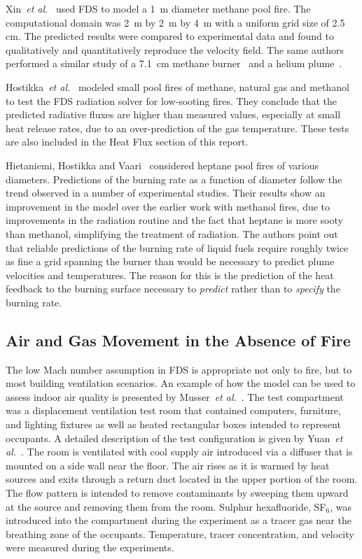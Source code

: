 Xin~{\em et  al.}~\cite{Xin:JSS2005} used FDS to model  a 1~m diameter methane pool  fire.  The  computational domain was  2~m by 2~m  by 4~m with  a uniform  grid  size of  2.5  cm.  The  predicted results  were compared  to   experimental  data  and  found   to  qualitatively  and quantitatively reproduce   the  velocity  field.   The  same  authors performed a similar study of a 7.1~cm methane burner~\cite{Xin:CF2005} and a helium plume~\cite{Xin:CS2002}.

Hostikka~{\em et al.}~\cite{Hostikka:3} modeled small pool fires of methane, natural gas and methanol  to test the FDS radiation solver for low-sooting fires.  They conclude that the predicted radiative fluxes are higher than measured values, especially at small heat release rates, due to an over-prediction of the gas temperature. These tests are also included in the Heat Flux section of this report.

Hietaniemi,  Hostikka and  Vaari~\cite{Hietaniemi:1}  considered heptane pool fires of various diameters.  Predictions of the burning rate as a function  of  diameter  follow  the  trend observed  in  a  number  of experimental studies.  Their results show an improvement  in the model over the earlier work with  methanol fires, due to improvements in the radiation  routine  and the  fact  that  heptane  is more  sooty  than methanol, simplifying  the treatment of radiation.   The authors point out  that reliable  predictions of  the burning  rate of  liquid fuels require roughly twice as fine a grid spanning the burner than would be necessary to predict plume velocities and temperatures. The reason for this is  the prediction of the heat  feedback to the  burning surface necessary to {\em predict} rather  than to {\em specify} the burning rate.


\subsection{Air and Gas Movement in the Absence of Fire}

The low Mach number assumption in FDS is appropriate not only to fire, but to  most building  ventilation scenarios.  An  example of  how the model can  be used  to  assess indoor  air  quality  is presented  by Musser~{\em  et  al.}~\cite{Musser:1}.   The  test compartment  was  a displacement ventilation  test   room   that  contained   computers, furniture, and  lighting fixtures as well as  heated rectangular boxes intended to  represent occupants.  A detailed description  of the test configuration is  given by Yuan~{\em et  al.}~\cite{Yuan:1}.  The room is ventilated with  cool supply air introduced via  a diffuser that is mounted on a side  wall near the floor. The air rises  as it is warmed by heat sources  and exits through a return duct  located in the upper portion  of  the  room.  The   flow  pattern  is  intended  to  remove contaminants by sweeping  them upward at the source  and removing them from the room.  Sulphur  hexafluoride, SF$_6$, was introduced into the compartment during the  experiment as a tracer gas  near the breathing zone  of  the   occupants.   Temperature,  tracer  concentration,  and velocity were  measured during the experiments.   

